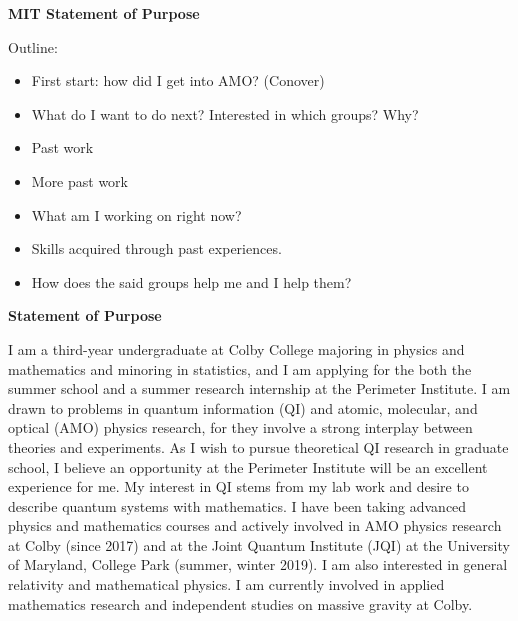 \documentclass[12pt]{article}
\begin{document}
	
	
\begin{center}
	\textbf{MIT Statement of Purpose}
\end{center}	

Outline:
\begin{itemize}
	\item First start: how did I get into AMO? (Conover)
	
	
	
	
	
	\item What do I want to do next? Interested in which groups? Why?
	
	\item Past work
	
	\item More past work
	 
	\item What am I working on right now?
	
	\item Skills acquired through past experiences.
	
	\item How does the said groups help me and I help them?
\end{itemize}


	
	
	
	
	
	
	
	
	
	
	
	

\newpage	
	
	
\begin{center}
	\textbf{Statement of Purpose}
\end{center}
	

\noindent I am a third-year undergraduate at Colby College majoring in physics and mathematics and minoring in statistics, and I am applying for the both the summer school and a summer research internship at the Perimeter Institute. I am drawn to problems in quantum information (QI) and atomic, molecular, and optical (AMO) physics research, for they involve a strong interplay between theories and experiments. As I wish to pursue theoretical QI research in graduate school, I believe an opportunity at the Perimeter Institute will be an excellent experience for me. My interest in QI stems from my lab work and desire to describe quantum systems with mathematics. I have been taking advanced physics and mathematics courses and actively involved in AMO physics research at Colby (since 2017) and at the Joint Quantum Institute (JQI) at the University of Maryland, College Park (summer, winter 2019). I am also interested in general relativity and mathematical physics. I am currently involved in applied mathematics research and independent studies on massive gravity at Colby.   \\
\end{document}
